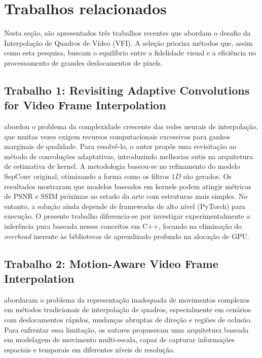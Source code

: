 \documentclass[
    12pt,                %
    openright,           %
    oneside,             %
    a4paper,             %
    english,             %
    brazil               %
]{abntex2}
\begin{document}
\section{Trabalhos relacionados}
\label{sec:trabalhos_relacionados}

Nesta seção, são apresentados três trabalhos recentes que abordam o desafio da Interpolação de Quadros de Vídeo (VFI). A seleção prioriza métodos que, assim como esta pesquisa, buscam o equilíbrio entre a fidelidade visual e a eficiência no processamento de grandes deslocamentos de pixels.

\subsection{Trabalho 1: Revisiting Adaptive Convolutions for Video Frame Interpolation}

 abordou o problema da complexidade crescente das redes neurais de interpolação, que muitas vezes exigem recursos computacionais excessivos para ganhos marginais de qualidade. Para resolvê-lo, o autor propôs uma revisitação ao método de convoluções adaptativas, introduzindo melhorias sutis na arquitetura de estimativa de kernel. A metodologia baseou-se no refinamento do modelo SepConv original, otimizando a forma como os filtros $1D$ são gerados. Os resultados mostraram que modelos baseados em kernels podem atingir métricas de PSNR e SSIM próximas ao estado da arte com estruturas mais simples. No entanto, a solução ainda depende de frameworks de alto nível (PyTorch) para execução. O presente trabalho diferencia-se por investigar experimentalmente a inferência pura baseada nesses conceitos em C++, focando na eliminação do \textit{overhead} inerente às bibliotecas de aprendizado profundo na alocação de GPU.

\subsection{Trabalho 2: Motion-Aware Video Frame Interpolation}

 abordaram o problema da representação inadequada de movimentos complexos em métodos tradicionais de interpolação de quadros, especialmente em cenários com deslocamentos rápidos, mudanças abruptas de direção e regiões de oclusão. Para enfrentar essa limitação, os autores propuseram uma arquitetura baseada em modelagem de movimento multi-escala, capaz de capturar informações espaciais e temporais em diferentes níveis de resolução.
\end{document}
